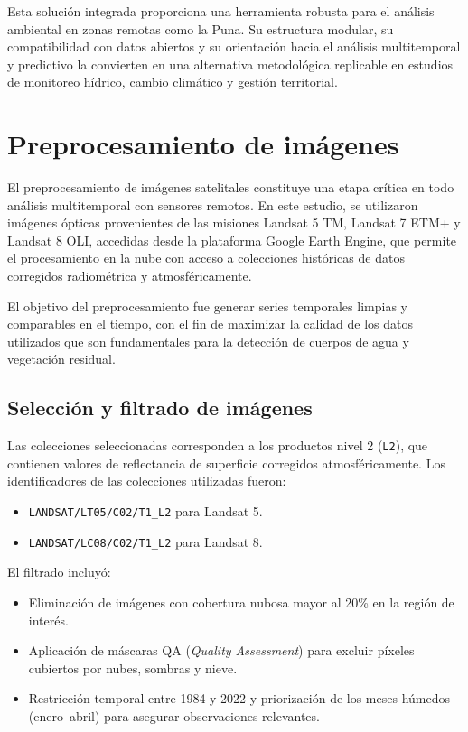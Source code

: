 Esta solución integrada proporciona una herramienta robusta para el análisis ambiental en zonas remotas como la Puna. Su estructura modular, su compatibilidad con datos abiertos y su orientación hacia el análisis multitemporal y predictivo la convierten en una alternativa metodológica replicable en estudios de monitoreo hídrico, cambio climático y gestión territorial.

\section{Preprocesamiento de imágenes}

El preprocesamiento de imágenes satelitales constituye una etapa crítica en todo análisis multitemporal con sensores remotos. En este estudio, se utilizaron imágenes ópticas provenientes de las misiones Landsat 5 TM, Landsat 7 ETM+ y Landsat 8 OLI, accedidas desde la plataforma Google Earth Engine, que permite el procesamiento en la nube con acceso a colecciones históricas de datos corregidos radiométrica y atmosféricamente.

El objetivo del preprocesamiento fue generar series temporales limpias y comparables en el tiempo, con el fin de maximizar la calidad de los datos utilizados que son fundamentales para la detección de cuerpos de agua y vegetación residual. 

\subsection{Selección y filtrado de imágenes}

Las colecciones seleccionadas corresponden a los productos nivel 2 (\texttt{L2}), que contienen valores de reflectancia de superficie corregidos atmosféricamente. Los identificadores de las colecciones utilizadas fueron:

\begin{itemize}
    \item \texttt{LANDSAT/LT05/C02/T1\_L2} para Landsat 5.
    \item \texttt{LANDSAT/LC08/C02/T1\_L2} para Landsat 8.
\end{itemize}

El filtrado incluyó:
\begin{itemize}
    \item Eliminación de imágenes con cobertura nubosa mayor al 20\% en la región de interés.
    \item Aplicación de máscaras QA (\textit{Quality Assessment}) para excluir píxeles cubiertos por nubes, sombras y nieve.
    \item Restricción temporal entre 1984 y 2022 y priorización de los meses húmedos (enero–abril) para asegurar observaciones relevantes.
\end{itemize}

